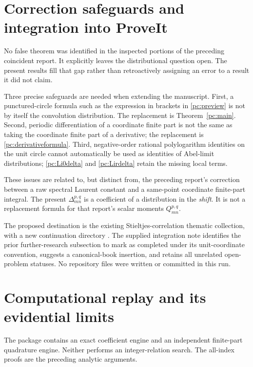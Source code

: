 \documentclass[11pt,a4paper]{article}
\numberwithin{equation}{section}
\theoremstyle{definition}
\begin{document}
\section{Correction safeguards and integration into ProveIt}\label{pc:corrections}
No false theorem was identified in the inspected portions of the preceding coincident report. It explicitly leaves the distributional question open. The present results fill that gap rather than retroactively assigning an error to a result it did not claim.

Three precise safeguards are needed when extending the manuscript. First, a punctured-circle formula such as the expression in brackets in \eqref{pc:preview} is not by itself the convolution distribution. The replacement is Theorem~\ref{pc:main}. Second, periodic differentiation of a coordinate finite part is not the same as taking the coordinate finite part of a derivative; the replacement is \eqref{pc:derivativeformula}. Third, negative-order rational polylogarithm identities on the unit circle cannot automatically be used as identities of Abel-limit distributions; \eqref{pc:Li0delta} and \eqref{pc:Lirdelta} retain the missing local terms.

These issues are related to, but distinct from, the preceding report's correction between a raw spectral Laurent constant and a same-point coordinate finite-part integral. The present $\Delta_{mn}^{p,q}$ is a coefficient of a distribution in the \emph{shift}. It is not a replacement formula for that report's scalar moments $Q_{mn}^{p,q}$.

The proposed destination is the existing Stieltjes-correlation thematic collection, with a new continuation directory . The supplied integration note identifies the prior further-research subsection to mark as completed under its unit-coordinate convention, suggests a canonical-book insertion, and retains all unrelated open-problem statuses. No repository files were written or committed in this run.

\section{Computational replay and its evidential limits}\label{pc:validation}
The package contains an exact coefficient engine and an independent finite-part quadrature engine. Neither performs an integer-relation search. The all-index proofs are the preceding analytic arguments.
\end{document}
